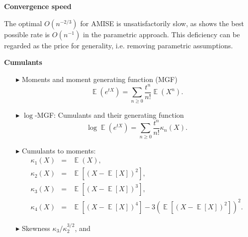 \documentclass[19pt,landscaoe]{article}
\DeclareMathOperator{\E}{\mathbb{E}}
\begin{document}
\newpage
{\LARGE\centerline{\textbf{Convergence speed}}}
\vskip25pt
\begin{minipage}{.9\textwidth}
    \Large 
    The optimal $O(n^{-2/3})$ for AMISE is unsatisfactorily slow, as \cite{boydsteele78} shows the best possible rate is $O(n^{-1})$ in the parametric approach. This deficiency can be regarded as the price for generality, i.e. removing parametric assumptions.  
\end{minipage}

\newpage
{\LARGE\centerline{\textbf{Cumulants}}}
\vskip25pt
\begin{minipage}{.9\textwidth}
    \large 
  \begin{itemize}
    \item[$\blacktriangleright$] Moments and moment generating function (MGF)
    \begin{equation*}
        \E\left(e^{tX}\right)=\sum_{n\ge0}\frac{t^n}{n!}\E(X^n).
    \end{equation*}
    \item[$\blacktriangleright$] $\log$-MGF: Cumulants and their generating function
\begin{equation*}
    \log\E\left(e^{tX}\right)=\sum_{n\ge0}\frac{t^n}{n!}\kappa_n(X).
\end{equation*}
    \item[$\blacktriangleright$] Cumulants to moments:
\begin{eqnarray}
    \kappa_1(X)&=&\E(X),\nonumber\\
    \kappa_2(X)&=&\E[(X-\E[X])^2],\nonumber\\
    \kappa_3(X)&=&\E[(X-\E[X])^3],\nonumber\\
    \kappa_4(X)&=&\E[(X-\E[X])^4]-3(\E[(X-\E[X])^2])^2.\nonumber
\end{eqnarray}
    \item[$\blacktriangleright$] Skewness  $\kappa_3/\kappa_2^{3/2}$, and 
  \end{itemize}
\end{minipage}
\end{document}
